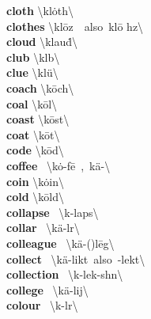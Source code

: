 \documentclass[10pt,a4paper]{article}
\begin{document}
\begin{multicols}{2}
\textbf{ cloth }\quad \textbackslash \textprimstress kl\.{o}th\textbackslash \\
\textbf{ clothes }\quad \textbackslash \textprimstress kl\={o}z\ \ also\ \textprimstress kl\={o} hz\textbackslash \\
\textbf{ cloud }\quad \textbackslash \textprimstress klau\. d\textbackslash \\
\textbf{ club }\quad \textbackslash \textprimstress kl\textschwa b\textbackslash \\
\textbf{ clue }\quad \textbackslash \textprimstress kl\"{u}\textbackslash \\
\textbf{ coach }\quad \textbackslash \textprimstress k\={o}ch\textbackslash \\
\textbf{ coal }\quad \textbackslash \textprimstress k\={o}l\textbackslash \\
\textbf{ coast }\quad \textbackslash \textprimstress k\={o}st\textbackslash \\
\textbf{ coat }\quad \textbackslash \textprimstress k\={o}t\textbackslash \\
\textbf{ code }\quad \textbackslash \textprimstress k\={o}d\textbackslash \\
\textbf{ coffee }\quad \ \textbackslash \textprimstress k\.{o}-f\={e}\ ,\ \textprimstress k\"{a}-\textbackslash \\
\textbf{ coin }\quad \textbackslash \textprimstress k\.{o}in\textbackslash \\
\textbf{ cold }\quad \textbackslash \textprimstress k\={o}ld\textbackslash \\
\textbf{ collapse }\quad \ \textbackslash k\textschwa -\textprimstress laps\textbackslash \\
\textbf{ collar }\quad \ \textbackslash \textprimstress k\"{a}-l\textschwa r\textbackslash \\
\textbf{ colleague }\quad \ \textbackslash \textprimstress k\"{a}-(\textsecstress )l\={e}g\textbackslash \\
\textbf{ collect }\quad \ \textbackslash \textprimstress k\"{a}-likt\ also\ -\textsecstress lekt\textbackslash \\
\textbf{ collection }\quad \ \textbackslash k\textschwa -\textprimstress lek-sh\textschwa n\textbackslash \\
\textbf{ college }\quad \ \textbackslash \textprimstress k\"{a}-lij\textbackslash \\
\textbf{ colour }\quad \ \textbackslash \textprimstress k\textschwa -l\textschwa r\textbackslash \\

\end{multicols}
\end{document}
